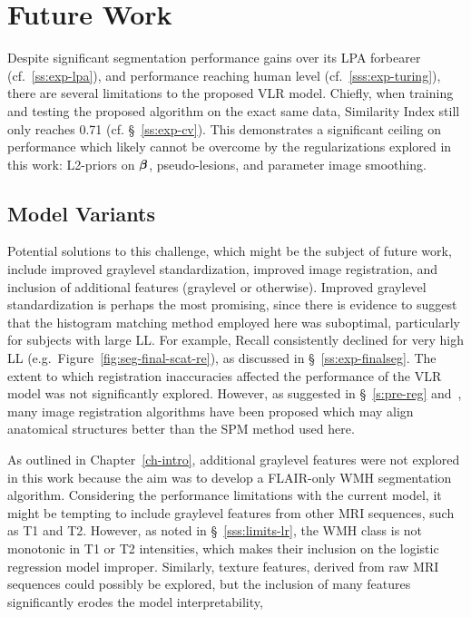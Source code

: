 \section{Future Work}
Despite significant segmentation performance gains over its LPA forbearer (cf.~\ref{ss:exp-lpa}),
and performance reaching human level (cf.~\ref{sss:exp-turing}),
there are several limitations to the proposed VLR model.
Chiefly, when training and testing the proposed algorithm on the exact same data,
Similarity Index still only reaches 0.71 (cf. \S~\ref{ss:exp-cv}).
This demonstrates a significant ceiling on performance
which likely cannot be overcome by the regularizations explored in this work:
L2-priors on $\bm{\beta}$, pseudo-lesions, and parameter image smoothing.
\subsection{Model Variants}
Potential solutions to this challenge, which might be the subject of future work, include
improved graylevel standardization,
improved image registration, and
inclusion of additional features (graylevel or otherwise).
Improved graylevel standardization is perhaps the most promising,
since there is evidence to suggest that the histogram matching method employed
here was suboptimal, particularly for subjects with large LL.
For example, Recall consistently declined for very high LL
(e.g.\ Figure~\ref{fig:seg-final-scat-re}), as discussed in \S~\ref{ss:exp-finalseg}.
The extent to which registration inaccuracies affected the performance of the VLR model
was not significantly explored.
However, as suggested in \S~\ref{s:pre-reg} and~\cite{Klein2009},
many image registration algorithms have been proposed
which may align anatomical structures better than the SPM  method used here.
\par
As outlined in Chapter~\ref{ch-intro}, additional graylevel features were not explored in this work
because the aim was to develop a FLAIR-only WMH segmentation algorithm.
Considering the performance limitations with the current model,
it might be tempting to include graylevel features from other MRI sequences, such as T1 and T2.
However, as noted in \S~\ref{sss:limits-lr}, the WMH class is not monotonic in
T1 or T2 intensities, which makes their inclusion on the logistic regression model improper.
Similarly, texture features, derived from raw MRI sequences could possibly be explored,
but the inclusion of many features significantly erodes the model interpretability,
